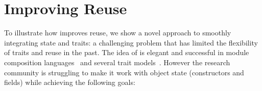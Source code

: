 \saveSpace\saveSpace\section{Improving Reuse}\saveSpace




To illustrate how \name improves reuse,
we show a novel approach
to smoothly integrating state and traits: a challenging problem that has limited the flexibility of traits and
reuse in the past.
The idea of  is elegant and successful in module
composition languages~\cite{ancona2002calculus} and several trait
models~\cite{ducasse2006traits,Bergel2007,BETTINI2013521,fjig}. 
 However the research
community is struggling to make it work with object state (constructors
and fields) while achieving the following goals:

